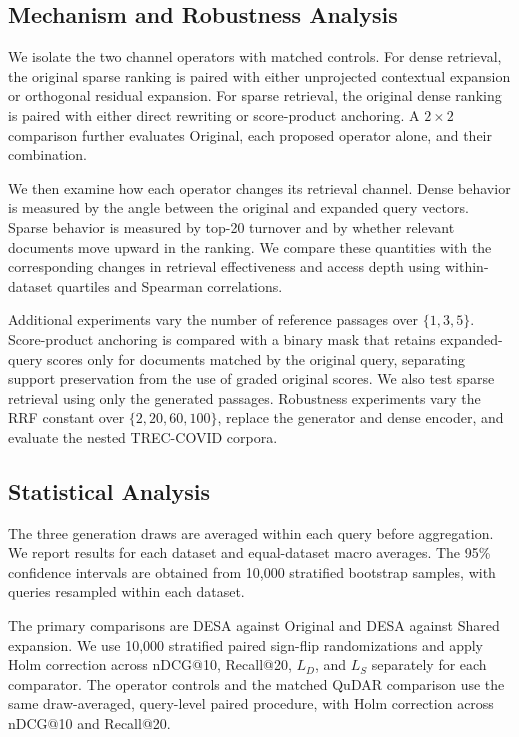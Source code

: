 \subsection{Mechanism and Robustness Analysis}

We isolate the two channel operators with matched controls. For dense
retrieval, the original sparse ranking is paired with either unprojected
contextual expansion or orthogonal residual expansion. For sparse retrieval,
the original dense ranking is paired with either direct rewriting or
score-product anchoring. A $2\times2$ comparison further evaluates Original,
each proposed operator alone, and their combination.

We then examine how each operator changes its retrieval channel. Dense behavior
is measured by the angle between the original and expanded query vectors.
Sparse behavior is measured by top-20 turnover and by whether relevant
documents move upward in the ranking. We compare these quantities with the
corresponding changes in retrieval effectiveness and access depth using
within-dataset quartiles and Spearman correlations.

Additional experiments vary the number of reference passages over
$\{1,3,5\}$. Score-product anchoring is compared with a binary mask that
retains expanded-query scores only for documents matched by the original
query, separating support preservation from the use of graded original scores.
We also test sparse retrieval using only the generated passages. Robustness
experiments vary the RRF constant over $\{2,20,60,100\}$, replace the generator
and dense encoder, and evaluate the nested TREC-COVID corpora.

\subsection{Statistical Analysis}

The three generation draws are averaged within each query before aggregation.
We report results for each dataset and equal-dataset macro averages. The 95\%
confidence intervals are obtained from 10,000 stratified bootstrap samples,
with queries resampled within each dataset.

The primary comparisons are DESA against Original and DESA
against Shared expansion. We use 10,000 stratified paired sign-flip
randomizations and apply Holm correction across nDCG@10, Recall@20, $L_D$, and
$L_S$ separately for each comparator. The operator controls and the matched
QuDAR comparison use the same draw-averaged, query-level paired procedure, with
Holm correction across nDCG@10 and Recall@20.
